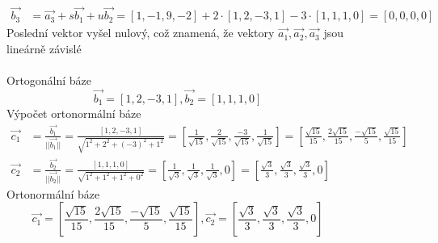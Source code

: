 \begin{figure}
\begin{equation*}
\begin{aligned}
  \vec{b_3} &= \vec{a_3} + s \vec{b_1} + u \vec{b_2}
  = [1, -1, 9, -2] + 2 \cdot [1, 2, -3, 1] -3 \cdot [1, 1, 1, 0]
  = [0, 0, 0, 0]
    \end{aligned}
\end{equation*}
Poslední vektor vyšel nulový, což znamená, že vektory  $\vec{a_1},\vec{a_2}, \vec{a_3}$  jsou lineárně závislé \\\\
Ortogonální báze
$$ \vec{b_1} = [1, 2, -3, 1], \vec{b_2} = [1, 1, 1, 0]$$
Výpočet ortonormální báze
\begin{equation*}
    \begin{aligned}
        \vec{c_1} &= \frac{\vec{b_1}}{||\vec{b_1}||}
        = \frac{[1, 2, -3, 1]}{\sqrt{1^2 + 2^2 + (-3)^2 + 1^2}}
        = \left[\frac{1}{\sqrt{15}}, \frac{2}{\sqrt{15}}, \frac{-3}{\sqrt{15}}, \frac{1}{\sqrt{15}}\right]
        = \left[\frac{\sqrt{15}}{15}, \frac{2\sqrt{15}}{15}, \frac{-\sqrt{15}}{5}, \frac{\sqrt{15}}{15}\right] \\
        \vec{c_2} &= \frac{\vec{b_2}}{||\vec{b_2}||}
        = \frac{[1, 1, 1, 0]}{\sqrt{1^2 + 1^2 + 1^2 + 0^2}}
        = \left[\frac{1}{\sqrt{3}}, \frac{1}{\sqrt{3}}, \frac{1}{\sqrt{3}},0\right]
        = \left[\frac{\sqrt{3}}{3}, \frac{\sqrt{3}}{3}, \frac{\sqrt{3}}{3},0\right]
    \end{aligned}
\end{equation*}
Ortonormální báze
$$ \vec{c_1} = \left[\frac{\sqrt{15}}{15}, \frac{2\sqrt{15}}{15}, \frac{-\sqrt{15}}{5}, \frac{\sqrt{15}}{15}\right], \vec{c_2} = \left[\frac{\sqrt{3}}{3}, \frac{\sqrt{3}}{3}, \frac{\sqrt{3}}{3},0\right]$$
\end{figure}